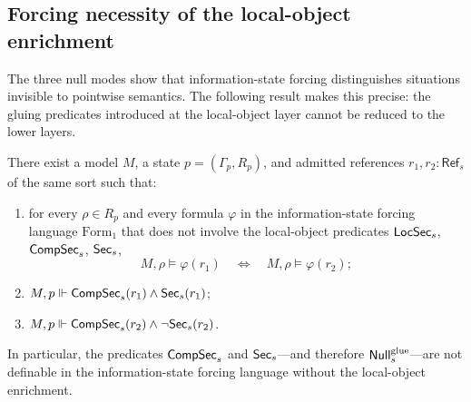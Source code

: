 \subsection{Forcing necessity of the local-object enrichment}

The three null modes show that information-state forcing distinguishes situations invisible to pointwise semantics. The following result makes this precise: the gluing predicates introduced at the local-object layer cannot be reduced to the lower layers.

\begin{theorem}\label{thm:pointwise-irreducibility}
There exist a model $M$, a state $p=(\Gamma_p,R_p)$, and admitted references $r_1,r_2:\mathsf{Ref}_s$ of the same sort such that:
\begin{enumerate}[label=(\roman*),nosep]
\item for every $\rho\in R_p$ and every formula $\varphi$ in the information-state forcing language $\mathrm{Form}_1$ that does not involve the local-object predicates $\mathsf{LocSec}_s$, $\mathsf{CompSec}_s$, $\mathsf{Sec}_s$,
\[
M,\rho\models\varphi(r_1)
\quad\Longleftrightarrow\quad
M,\rho\models\varphi(r_2);
\]
\item $M,p\Vdash \mathsf{CompSec}_s(r_1)\land \mathsf{Sec}_s(r_1)$;
\item $M,p\Vdash \mathsf{CompSec}_s(r_2)\land \neg\mathsf{Sec}_s(r_2)$.
\end{enumerate}
In particular, the predicates $\mathsf{CompSec}_s$ and $\mathsf{Sec}_s$---and therefore $\mathsf{Null}^{\mathrm{glue}}_s$---are not definable in the information-state forcing language without the local-object enrichment.
\end{theorem}

